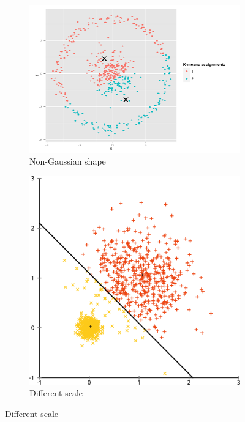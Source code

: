 \documentclass[./some_latex_template.tex]{subfiles}
\begin{document}
\begin{figure}[H]
  \begin{subfigure}[b]{0.6\textwidth}
    \includegraphics[width=\textwidth]{figures/shape.png}
    \caption{Non-Gaussian shape}
    \label{fig:1}
  \end{subfigure}
  \begin{subfigure}[b]{0.4\textwidth}
    \includegraphics[width=\textwidth]{figures/scale.png}
    \caption{Different scale}
    \label{fig:2}
  \end{subfigure}
\end{figure}
\end{document}
